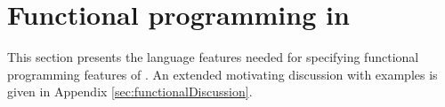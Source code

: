 \section{Functional programming in \lang [C++]}
\label{sec:functional}

This section presents the language features needed for specifying functional programming features of \lang. An extended motivating discussion with examples is given in Appendix \ref{sec:functionalDiscussion}.



